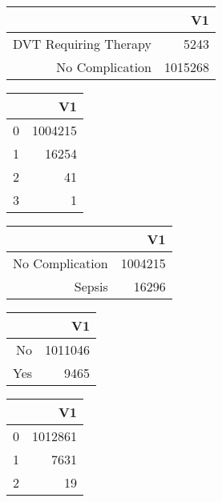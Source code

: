 \bigskip\bigskip
\centering
\begin{tabular}{rr}
  \hline
 & V1 \\ 
  \hline
DVT Requiring Therapy & 5243 \\ 
  No Complication & 1015268 \\ 
   \hline
\end{tabular}

\bigskip\bigskip
\centering
\begin{tabular}{rr}
  \hline
 & V1 \\ 
  \hline
0 & 1004215 \\ 
  1 & 16254 \\ 
  2 &  41 \\ 
  3 &   1 \\ 
   \hline
\end{tabular}

\bigskip\bigskip
\centering
\begin{tabular}{rr}
  \hline
 & V1 \\ 
  \hline
No Complication & 1004215 \\ 
  Sepsis & 16296 \\ 
   \hline
\end{tabular}

\bigskip\bigskip
\centering
\begin{tabular}{rr}
  \hline
 & V1 \\ 
  \hline
No & 1011046 \\ 
  Yes & 9465 \\ 
   \hline
\end{tabular}

\bigskip\bigskip
\centering
\begin{tabular}{rr}
  \hline
 & V1 \\ 
  \hline
0 & 1012861 \\ 
  1 & 7631 \\ 
  2 &  19 \\ 
   \hline
\end{tabular}

